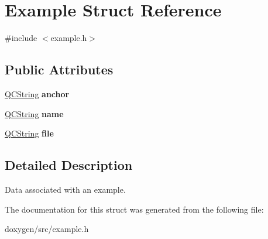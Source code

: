 \hypertarget{struct_example}{}\section{Example Struct Reference}
\label{struct_example}


{\ttfamily \#include $<$example.\+h$>$}

\subsection*{Public Attributes}
\begin{DoxyCompactItemize}
\item 
\mbox{\label{struct_example_ad77c6c2bbf3a3cd277ee24df5a3d6190}} 
\mbox{\hyperlink{class_q_c_string}{Q\+C\+String}} {\bfseries anchor}
\item 
\mbox{\label{struct_example_a3ff74d2063cc9dc8b836ce95e79af75d}} 
\mbox{\hyperlink{class_q_c_string}{Q\+C\+String}} {\bfseries name}
\item 
\mbox{\label{struct_example_a5641a1748c9b207ca684c70d8183a7d8}} 
\mbox{\hyperlink{class_q_c_string}{Q\+C\+String}} {\bfseries file}
\end{DoxyCompactItemize}


\subsection{Detailed Description}
Data associated with an example. 

The documentation for this struct was generated from the following file\+:\begin{DoxyCompactItemize}
\item 
doxygen/src/example.\+h\end{DoxyCompactItemize}
